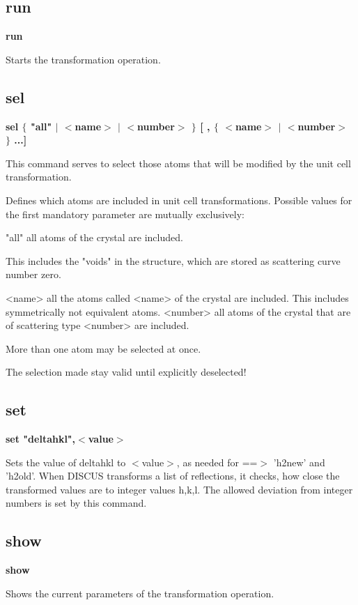 \subsection*{run}
{\bf run \par }
\par
\vspace{3pt}
Starts the transformation operation. 
\subsection*{sel}
{\bf sel $ \{$ "all" $| $ $ <$name$> $ $| $ $ <$number$> $ $\} $ [ , $ \{$ $ <$name$> $ $| $ $ <$number$> $ $\} $ ...] \par }
\par
\vspace{3pt}
This command serves to select 
those atoms that will be modified by the unit cell transformation. 
\par
Defines which atoms are included in unit cell transformations. 
Possible values for the first mandatory parameter are mutually 
exclusively: 
\par
\begin{MacVerbatim}
"all"     all atoms of the crystal are included.
\end{MacVerbatim}
          This includes the "voids" in the structure, which are stored 
          as scattering curve number zero. 
\begin{MacVerbatim}
<name>    all the atoms called <name> of the crystal are included.
          This includes symmetrically not equivalent atoms.
<number>  all atoms of the crystal that are of scattering type <number>
          are included.
\end{MacVerbatim}
More than one atom may be selected at once. 
\par
The selection made stay valid until explicitly deselected! 
\subsection*{set}
{\bf set "deltahkl",$ <$value$> $ \par }
\par
\vspace{3pt}
Sets the value of deltahkl to $ <$value$> $, as needed for ==$> $ 'h2new' and 
'h2old'. When DISCUS transforms a list of reflections, it checks, 
how close the transformed values are to integer values h,k,l. The 
allowed deviation from integer numbers is set by this command. 
\subsection*{show}
{\bf show \par }
\par
\vspace{3pt}
Shows the current parameters of the transformation operation. 
